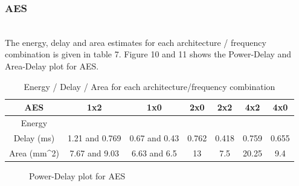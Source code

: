 \documentclass[a4paper, twoside]{article}      %
\begin{document}
\subsubsection{AES}
\\
The energy, delay and area estimates for each architecture / frequency combination is given in table 7.
Figure 10 and 11 shows the Power-Delay and Area-Delay plot for AES.

\begin{table}[h!]
\caption{Energy / Delay / Area for each architecture/frequency combination}
\begin{center}
{\begin{tabular}{|c | c |  c |  c  | c  |  c |  c|}
\hline
AES &1x2 &1x0 &2x0 &2x2 &4x2 &4x0 \\ [1ex]
\hline
Energy &&&&&& \\ [1ex]
\hline
Delay (ms)& 1.21 and 0.769& 0.67 and 0.43& 0.762& 0.418& 0.759& 0.655\\[1ex] \hline
Area (mm^2)& 7.67 and 9.03& 6.63 and 6.5 & 13& 7.5& 20.25& 9.4\\[1ex]
\hline

\end{tabular}}
\label{diffstruc}
\end{center}
\end{table}


\begin{figure}[h!]
{\centering {} \par}
\caption{Power-Delay plot for AES}
\end{figure}
\end{document}
